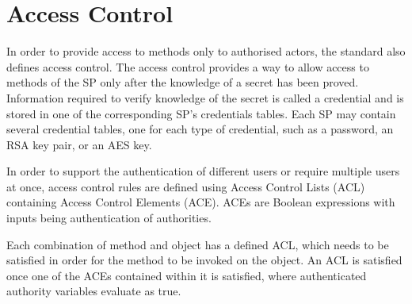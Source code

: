 





\section{Access Control}
\label{section:access_control}

In order to provide access to methods only to authorised actors, the standard also defines access control. The access control provides a way to allow access to methods of the SP only after the knowledge of a secret has been proved. Information required to verify knowledge of the secret is called a credential and is stored in one of the corresponding SP's credentials tables. Each SP may contain several credential tables, one for each type of credential, such as a password,  an RSA key pair, or an AES key.

In order to support the authentication of different users or require multiple users at once, access control rules are defined using Access Control Lists (ACL) containing Access Control Elements (ACE). ACEs are Boolean expressions with inputs being authentication of authorities.

Each combination of method and object has a defined ACL, which needs to be satisfied in order for the method to be invoked on the object. An ACL is satisfied once one of the ACEs contained within it is satisfied, where authenticated authority variables evaluate as true.




